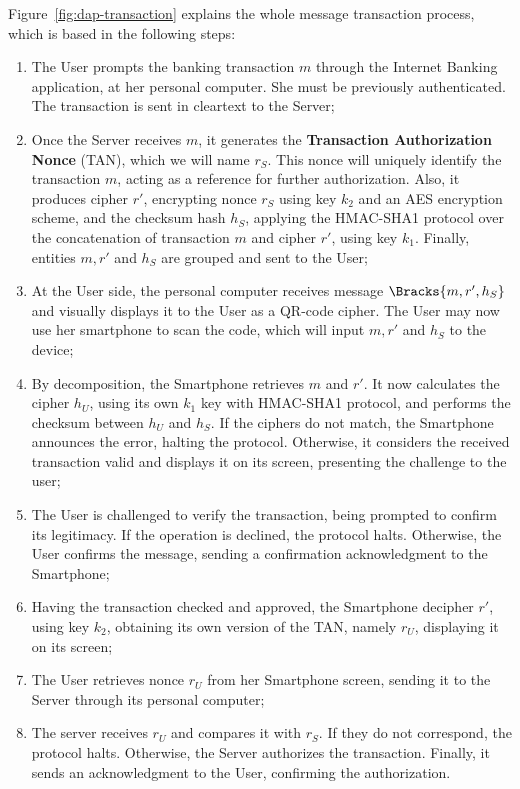 Figure~\ref{fig:dap-transaction} explains the whole message transaction process, which is based in the following steps:

\begin{enumerate}
  \item The User prompts the banking transaction \(m\) through the Internet Banking application, at her personal computer. She must be previously authenticated. The transaction is sent in cleartext to the Server;

  \item Once the Server receives \(m\), it generates the \textbf{Transaction Authorization Nonce} (TAN), which we will name \(r_S\). This nonce will uniquely identify the transaction \(m\), acting as a reference for further authorization. Also, it produces cipher \(r'\), encrypting nonce \(r_S\) using key \(k_2\) and an AES encryption scheme, and the checksum hash \(h_S\), applying the HMAC-SHA1 protocol over the concatenation of transaction \(m\) and cipher \(r'\), using key \(k_1\). Finally, entities \(m, r'\) and \(h_S\) are grouped and sent to the User;

  \item At the User side, the personal computer receives message \(\Bracks{m, r', h_S}\) and visually displays it to the User as a QR-code cipher. The User may now use her smartphone to scan the code, which will input \(m, r'\) and \(h_S\) to the device;

  \item By decomposition, the Smartphone retrieves \(m\) and \(r'\). It now calculates the cipher \(h_U\), using its own \(k_1\) key with HMAC-SHA1 protocol, and performs the checksum between \(h_U\) and \(h_S\). If the ciphers do not match, the Smartphone announces the error, halting the protocol. Otherwise, it considers the received transaction valid and displays it on its screen, presenting the challenge to the user;

  \item The User is challenged to verify the transaction, being prompted to confirm its legitimacy. If the operation is declined, the protocol halts. Otherwise, the User confirms the message, sending a confirmation acknowledgment to the Smartphone;

  \item Having the transaction checked and approved, the Smartphone decipher \(r'\), using key \(k_2\), obtaining its own version of the TAN, namely \(r_U\), displaying it on its screen;

  \item The User retrieves nonce \(r_U\) from her Smartphone screen, sending it to the Server through its personal computer;

  \item The server receives \(r_U\) and compares it with \(r_S\). If they do not correspond, the protocol halts. Otherwise, the Server authorizes the transaction. Finally, it sends an acknowledgment to the User, confirming the authorization.
\end{enumerate}

